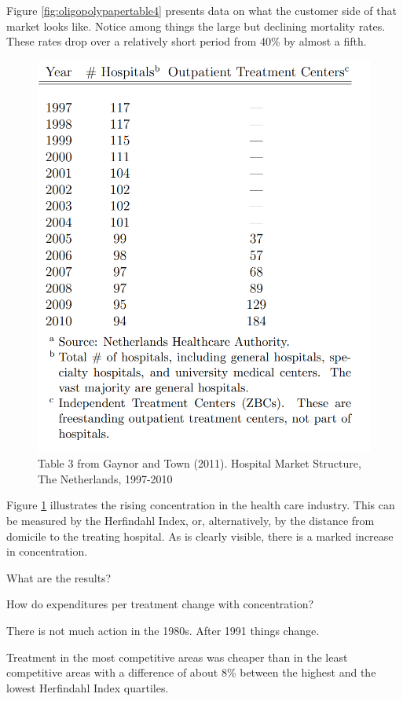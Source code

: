 \documentclass[
]{book}
\begin{document}
Figure \ref{fig:oligopolypapertable4} presents data on what the customer side of that market looks like. Notice among things the large but declining mortality rates. These rates drop over a relatively short period from 40\% by almost a fifth.

\begin{figure}

{\centering \includegraphics[width=0.7\linewidth]{img/oligopoly/papertable5} 

}

\caption{Table 3 from Gaynor and Town (2011). Hospital Market Structure, The Netherlands, 1997-2010}\label{fig:oligopolypapertable5}
\end{figure}

Figure \ref{fig:oligopolypapertable5} illustrates the rising concentration in the health care industry. This can be measured by the Herfindahl Index, or, alternatively, by the distance from domicile to the treating hospital. As is clearly visible, there is a marked increase in concentration.

What are the results?

How do expenditures per treatment change with concentration?

There is not much action in the 1980s. After 1991 things change.

Treatment in the most competitive areas was cheaper than in the least competitive areas with a difference of about 8\% between the highest and the lowest Herfindahl Index quartiles.
\end{document}
